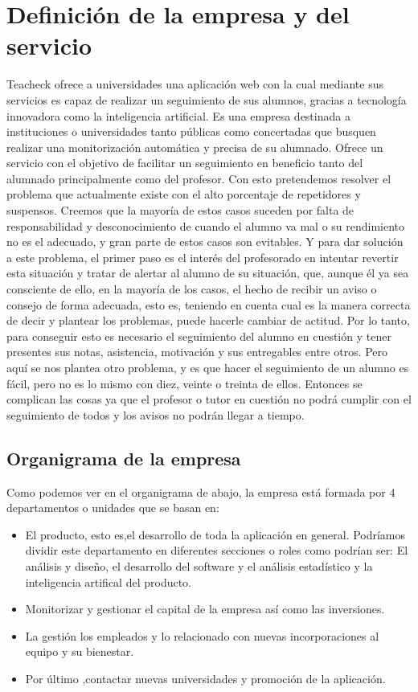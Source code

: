 \section{Definición de la empresa y del servicio}
Teacheck ofrece a universidades una aplicación web con la cual
mediante sus servicios es capaz de realizar un seguimiento de sus
alumnos, gracias a tecnología innovadora como la inteligencia
artificial.  Es una empresa destinada a instituciones o universidades
tanto públicas como concertadas que busquen realizar una
monitorización automática y precisa de su alumnado. Ofrece un servicio
con el objetivo de facilitar un seguimiento en beneficio tanto del
alumnado principalmente como del profesor. Con esto pretendemos
resolver el problema que actualmente existe con el alto porcentaje de
repetidores y suspensos. Creemos que la mayoría de estos casos suceden
por falta de responsabilidad y desconocimiento de cuando el alumno va
mal o su rendimiento no es el adecuado, y gran parte de estos casos
son evitables. Y para dar solución a este problema, el primer paso es
el interés del profesorado en intentar revertir esta situación y
tratar de alertar al alumno de su situación, que, aunque él ya sea
consciente de ello, en la mayoría de los casos, el hecho de recibir un
aviso o consejo de forma adecuada, esto es, teniendo en cuenta cual es
la manera correcta de decir y plantear los problemas, puede hacerle
cambiar de actitud. Por lo tanto, para conseguir esto es necesario el
seguimiento del alumno en cuestión y tener presentes sus notas,
asistencia, motivación y sus entregables entre otros. Pero aquí se nos
plantea otro problema, y es que hacer el seguimiento de un alumno es
fácil, pero no es lo mismo con diez, veinte o treinta de
ellos. Entonces se complican las cosas ya que el profesor o tutor en
cuestión no podrá cumplir con el seguimiento de todos y los avisos no
podrán llegar a tiempo.
\subsection{Organigrama de la empresa}
Como podemos ver en el organigrama de abajo, la empresa está formada
por 4 departamentos o unidades que se basan en:
\begin{itemize}
\item{El producto, esto es,el desarrollo de toda la aplicación en
  general. Podríamos dividir este departamento en diferentes secciones
  o roles como podrían ser: El análisis y diseño, el desarrollo del
  software y el análisis estadístico y la inteligencia artifical del
  producto.}
\item{Monitorizar y gestionar el capital de la empresa así como las
  inversiones.}
\item{La gestión los empleados y lo relacionado con nuevas
  incorporaciones al equipo y su bienestar.}
\item{Por último ,contactar nuevas universidades y promoción de la
  aplicación.}
\end{itemize}
\subparagraph{}
